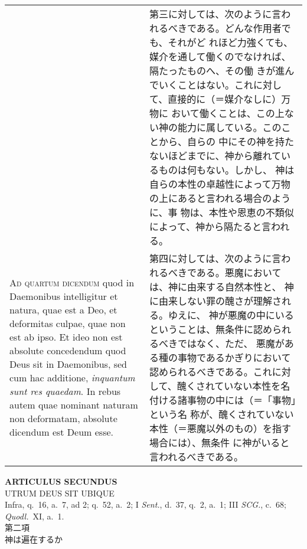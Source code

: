 \documentclass[10pt]{jsarticle} %
\begin{document}
\begin{longtable}{p{21em}p{21em}}
&

第三に対しては、次のように言われるべきである。どんな作用者でも、それがど
 れほど力強くても、媒介を通して働くのでなければ、隔たったものへ、その働
 きが進んでいくことはない。これに対して、直接的に（＝媒介なしに）万物に
 おいて働くことは、この上ない神の能力に属している。このことから、自らの
 中にその神を持たないほどまでに、神から離れているものは何もない。しかし、
 神は自らの本性の卓越性によって万物の上にあると言われる場合のように、事
 物は、本性や恩恵の不類似によって、神から隔たると言われる。

\\


{\scshape Ad quartum dicendum} quod in Daemonibus intelligitur et natura, quae
 est a Deo, et deformitas culpae, quae non est ab ipso. Et ideo non est
 absolute concedendum quod Deus sit in Daemonibus, sed cum hac
 additione, {\itshape inquantum sunt res quaedam}. In rebus autem quae nominant
 naturam non deformatam, absolute dicendum est Deum esse.

&

第四に対しては、次のように言われるべきである。悪魔においては、神に由来する自然本性と、
 神に由来しない罪の醜さが理解される。ゆえに、
 神が悪魔の中にいるということは、無条件に認められるべきではなく、ただ、
 悪魔がある種の事物であるかぎりにおいて認められるべきである。これに対
 して、醜くされていない本性を名付ける諸事物の中には（＝「事物」という名
 称が、醜くされていない本性（＝悪魔以外のもの）を指す場合には）、無条件
 に神がいると言われるべきである。


\end{longtable}
\newpage
{}
 

\begin{center}
 {\Large {\bf ARTICULUS SECUNDUS}}\\
 {\large UTRUM DEUS SIT UBIQUE}\\
 {\footnotesize Infra, q.~16, a.~7, ad 2; q.~52, a.~2; I {\itshape
 Sent.}, d.~37, q.~2, a.~1; III {\itshape SCG.}, c.~68; {\itshape
 Quodl.}~XI, a.~1.}\\
 {\Large 第二項\\神は遍在するか}
\end{center}
\end{document}
